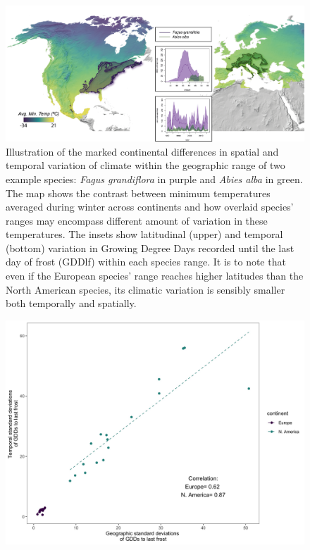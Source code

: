 \documentclass[12pt]{article}
\begin{document}
\begin{figure}[h!]
    \centering
 \includegraphics[width=\textwidth]{..//..//analyses/ranges/figures/concept figure draft2.png} 
    \caption{Illustration of the marked continental differences in spatial and temporal variation of climate within the geographic range of two example species: \emph{Fagus grandiflora} in purple and \emph{Abies alba} in green. The map shows the contrast between minimum temperatures averaged during winter across continents and how overlaid species' ranges may encompass different amount of variation in these temperatures. The insets show latitudinal (upper) and temporal (bottom) variation in Growing Degree Days recorded until the last day of frost (GDDlf) within each species range. It is to note that even if the European species' range reaches higher latitudes than the North American species, its climatic variation is sensibly smaller both temporally and spatially.}%
    \label{fig:concept}
\end{figure}

\begin{figure}[h!]
    \centering
 \includegraphics[width=\textwidth]{..//..//analyses/ranges/figures/clim_params.jpeg} 
    \label{fig:corrs}
\end{figure}
\end{document}
